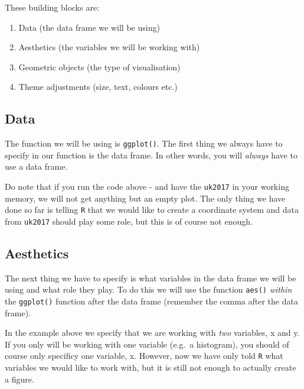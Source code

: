\documentclass[12pt,oneside]{reedthesis}
\providecommand{\tightlist}{%
  \setlength{\itemsep}{0pt}\setlength{\parskip}{0pt}}
\theoremstyle{definition}
\theoremstyle{definition}
\theoremstyle{definition}
\theoremstyle{remark}
\begin{document}
  These building blocks are:
  \begin{enumerate}
  \def\labelenumi{\arabic{enumi}.}
  \tightlist
  \item
    Data (the data frame we will be using)
  \item
    Aesthetics (the variables we will be working with)
  \item
    Geometric objects (the type of visualisation)
  \item
    Theme adjustments (size, text, colours etc.)
  \end{enumerate}
  \subsection{Data}\label{data}
  
  The function we will be using is \texttt{ggplot()}. The first thing we
  always have to specify in our function is the data frame. In other
  words, you will \emph{always} have to use a data frame.
  \begin{Shaded}
  \begin{Highlighting}[]
  \end{Highlighting}
  \end{Shaded}
  Do note that if you run the code above - and have the \texttt{uk2017} in
  your working memory, we will not get anything but an empty plot. The
  only thing we have done so far is telling \texttt{R} that we would like
  to create a coordinate system and data from \texttt{uk2017} should play
  some role, but this is of course not enough.
  
  \subsection{Aesthetics}\label{aesthetics}
  
  The next thing we have to specify is what variables in the data frame we
  will be using and what role they play. To do this we will use the
  function \texttt{aes()} \emph{within} the \texttt{ggplot()} function
  after the data frame (remember the comma after the data frame).
  \begin{Shaded}
  \begin{Highlighting}[]
  \NormalTok{(}
  \end{Highlighting}
  \end{Shaded}
  In the example above we specify that we are working with \emph{two}
  variables, x and y. If you only will be working with one variable
  (e.g.~a histogram), you should of course only specificy one variable, x.
  However, now we have only told \texttt{R} what variables we would like
  to work with, but it is still not enough to actually create a figure.
  
\end{document}
